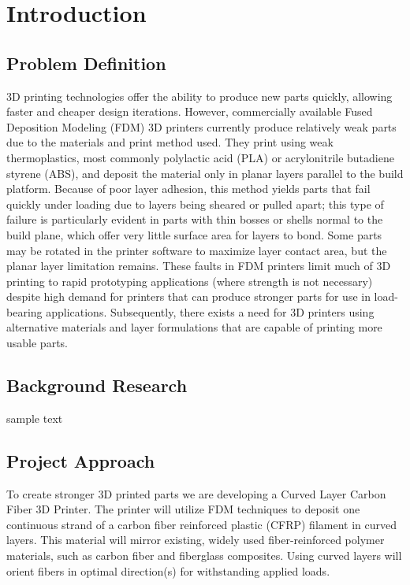 \section{Introduction}

\subsection{Problem Definition}

\indent

3D printing technologies offer the ability to produce new parts quickly, allowing faster and cheaper design iterations. However, commercially available Fused Deposition Modeling (FDM) 3D printers currently produce relatively weak parts due to the materials and print method used. They print using weak thermoplastics, most commonly polylactic acid (PLA) or acrylonitrile butadiene styrene (ABS), and deposit the material only in planar layers parallel to the build platform. Because of poor layer adhesion, this method yields parts that fail quickly under loading due to layers being sheared or pulled apart; this type of failure is particularly evident in parts with thin bosses or shells normal to the build plane, which offer very little surface area for layers to bond. Some parts may be rotated in the printer software to maximize layer contact area, but the planar layer limitation remains. These faults in FDM printers limit much of 3D printing to rapid prototyping applications (where strength is not necessary) despite high demand for printers that can produce stronger parts for use in load-bearing applications. Subsequently, there exists a need for 3D printers using alternative materials and layer formulations that are capable of printing more usable parts.\\

\subsection{Background Research}

\indent

sample text

\subsection{Project Approach}

\indent

To create stronger 3D printed parts we are developing a Curved Layer Carbon Fiber 3D Printer. The printer will utilize FDM techniques to deposit one continuous strand of a carbon fiber reinforced plastic (CFRP) filament in curved layers. This material will mirror existing, widely used fiber-reinforced polymer materials, such as carbon fiber and fiberglass composites. Using curved layers will orient fibers in optimal direction(s) for withstanding applied loads.

